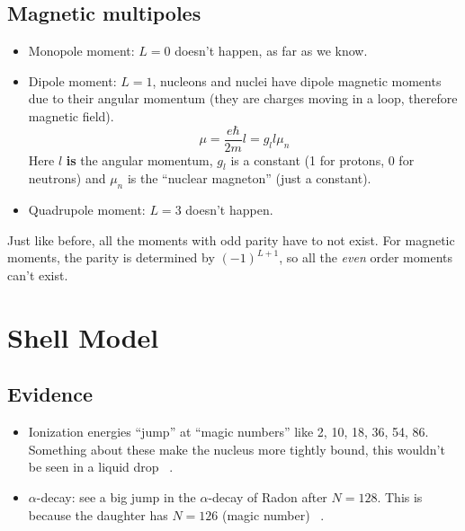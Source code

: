 \documentclass[letter]{article}
\begin{document}
\subsection{Magnetic multipoles}

\begin{itemize}
\item Monopole moment: $L=0$ doesn't happen, as far as we know.
\item Dipole moment: $L=1$, nucleons and nuclei have dipole magnetic
  moments due to their angular momentum (they are charges moving in a
  loop, therefore magnetic field). 
  \begin{equation*}
    \mu = \frac{e\hbar}{2m}l=g_ll\mu_n
  \end{equation*}
Here $l$ \textbf{is} the angular momentum, $g_l$ is a constant (1 for
protons, 0 for neutrons) and $\mu_n$ is the ``nuclear magneton'' (just
a constant).
\item Quadrupole moment: $L=3$ doesn't happen.
\end{itemize}

Just like before, all the moments with odd parity have to not
exist. For magnetic moments, the parity is determined by $(-1)^{L+1}$,
so all the \textit{even} order moments can't exist.

\section{Shell Model}

\subsection{Evidence}
\begin{itemize}
\item Ionization energies ``jump'' at ``magic numbers'' like 2, 10,
  18, 36, 54, 86. Something about these make the nucleus more tightly
  bound, this wouldn't be seen in a liquid
  drop ~\cite[Lec. 12]{lecture}.
\item $\alpha$-decay: see a big jump in the $\alpha$-decay of Radon
  after $N=128$. This is because the daughter has $N=126$ (magic
  number) ~\cite[Lec. 12]{lecture}.
\end{itemize}
\end{document}
